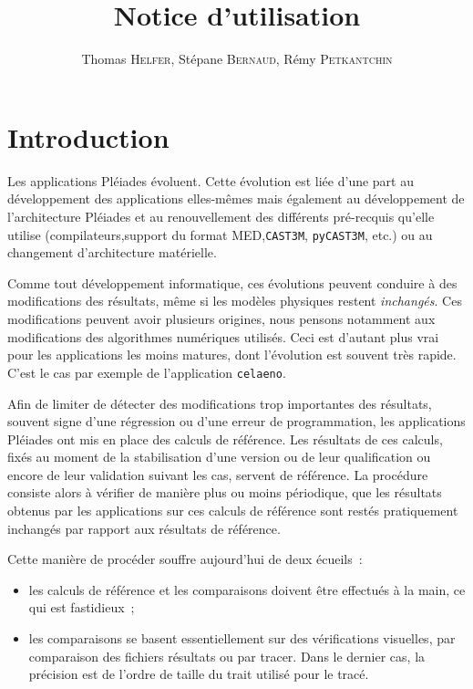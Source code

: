 \documentclass[a4paper,12pt]{article}
\title{\pcheck \\
\bigskip{}
Notice d'utilisation}
\author{Thomas \textsc{Helfer}, Stépane \textsc{Bernaud}, Rémy \textsc{Petkantchin}}
\newcommand{\celaeno}{{\tt celaeno}}
\newcommand{\tfel}{Pléiades}
\newcommand{\castem}{{\tt CAST3M}}
\begin{document}
\maketitle
\abstract{}

\parskip=5pt
\section{Introduction}

Les applications \tfel{} évoluent. Cette évolution est liée d'une
part au développement des applications elles-mêmes mais également au
développement de l'architecture \tfel{} et au renouvellement des
différents pré-recquis qu'elle utilise (compilateurs,support du format
MED,\castem{}, {\tt py\castem{}}, etc.) ou au changement
d'architecture matérielle.

Comme tout développement informatique, ces évolutions peuvent conduire
à des modifications des résultats, même si les modèles physiques
restent {\em inchangés}. Ces modifications peuvent avoir plusieurs
origines, nous pensons notamment aux modifications des algorithmes
numériques utilisés. Ceci est d'autant plus vrai pour les applications
les moins matures, dont l'évolution est souvent très rapide. C'est le
cas par exemple de l'application \celaeno{}.

Afin de limiter de détecter des modifications trop importantes des
résultats, souvent signe d'une régression ou d'une erreur de
programmation, les applications \tfel{} ont mis en place des
calculs de référence. Les résultats de ces calculs, fixés au moment de la
stabilisation d'une version ou de leur qualification ou encore de leur
validation suivant les cas, servent de référence. La procédure
consiste alors à vérifier de manière plus ou moins périodique, que les
résultats obtenus par les applications sur ces calculs de référence
sont restés pratiquement inchangés par rapport aux résultats de
référence.

Cette manière de procéder souffre aujourd'hui de deux écueils~:
\begin{itemize}
\item les calculs de référence et les comparaisons doivent être
effectués à la main, ce qui est fastidieux~;
\item les comparaisons se basent essentiellement sur des vérifications
visuelles, par comparaison des fichiers résultats ou par tracer. Dans
le dernier cas, la précision est de l'ordre de taille du trait utilisé
pour le tracé.
\end{itemize}
\end{document}
